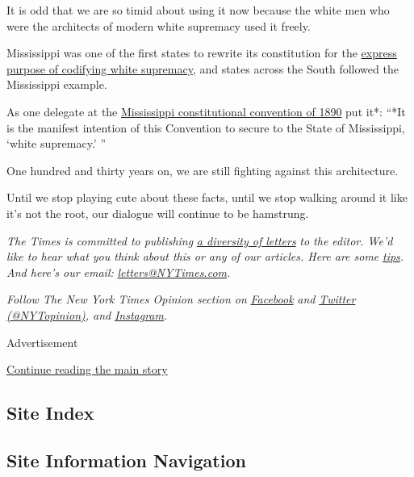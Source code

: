 It is odd that we are so timid about using it now because the white men
who were the architects of modern white supremacy used it freely.

Mississippi was one of the first states to rewrite its constitution for
the
\href{https://www.jstor.org/stable/25434804?read-now=1\&seq=1}{express
purpose of codifying white supremacy}, and states across the South
followed the Mississippi example.

As one delegate at the
\href{https://archive.org/stream/journalproceedi01convgoog\#page/n273/mode/2up/search/It+is+the+manifest+intention+of+this+Convention+to+secure+to+the+State+of+Mississippi}{Mississippi
constitutional convention of 1890} put it*: ``*It is the manifest
intention of this Convention to secure to the State of Mississippi,
`white supremacy.' ''

One hundred and thirty years on, we are still fighting against this
architecture.

Until we stop playing cute about these facts, until we stop walking
around it like it's not the root, our dialogue will continue to be
hamstrung.

\emph{The Times is committed to publishing}
\href{https://www.nytimes3xbfgragh.onion/2019/01/31/opinion/letters/letters-to-editor-new-york-times-women.html}{\emph{a
diversity of letters}} \emph{to the editor. We'd like to hear what you
think about this or any of our articles. Here are some}
\href{https://help.nytimes3xbfgragh.onion/hc/en-us/articles/115014925288-How-to-submit-a-letter-to-the-editor}{\emph{tips}}\emph{.
And here's our email:}
\href{mailto:letters@NYTimes.com}{\emph{letters@NYTimes.com}}\emph{.}

\emph{Follow The New York Times Opinion section on}
\href{https://www.facebookcorewwwi.onion/nytopinion}{\emph{Facebook}}
\emph{and} \href{http://twitter.com/NYTOpinion}{\emph{Twitter
(@NYTopinion)}}\emph{, and}
\href{https://www.instagram.com/nytopinion/}{\emph{Instagram}}\emph{.}

Advertisement

\protect\hyperlink{after-bottom}{Continue reading the main story}

\hypertarget{site-index}{%
\subsection{Site Index}\label{site-index}}

\hypertarget{site-information-navigation}{%
\subsection{Site Information
Navigation}\label{site-information-navigation}}

